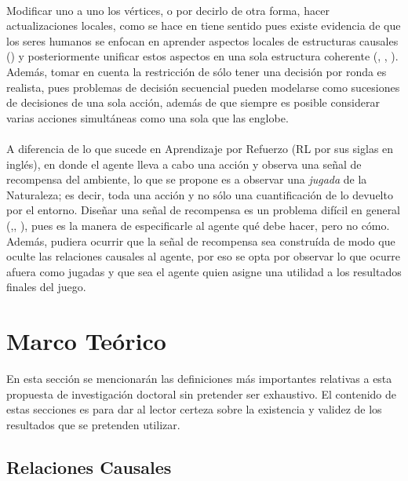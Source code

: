 \documentclass[11pt]{article}
\theoremstyle{plain}
\begin{document}
\\
\indent Modificar uno a uno los vértices, o por decirlo de otra forma, hacer actualizaciones locales, como se hace en \cite{lattimoreNIPS2016} tiene sentido pues existe evidencia de que los seres humanos se enfocan en aprender aspectos locales de estructuras causales (\cite{danks2014unifying}) y posteriormente unificar estos aspectos en una sola estructura coherente (\cite{fernbach2009causal}, \cite{waldmann2008causal}, \cite{wellen2012learning}). Además, tomar en cuenta la restricción de sólo tener una decisión por ronda es realista, pues problemas de decisión secuencial pueden modelarse como sucesiones de decisiones de una sola acción, además de que siempre es posible considerar varias acciones simultáneas como una sola que las englobe.\\
\\
\indent A diferencia de lo que sucede en Aprendizaje por Refuerzo (RL por sus siglas en inglés), en donde el agente lleva a cabo una acción y observa una señal de recompensa del ambiente, lo que se propone es a observar una \textit{jugada} de la Naturaleza; es decir, toda una acción y no sólo una cuantificación de lo devuelto por el entorno. Diseñar una señal de recompensa es un problema difícil en general (\cite{sutton1998reinforcement},\cite{dewey2014reinforcement}, \cite{DRLnotwork}), pues es la manera de especificarle al agente qué debe hacer, pero no cómo. Además, pudiera ocurrir que la señal de recompensa sea construída de modo que oculte las relaciones causales al agente, por eso se opta por observar lo que ocurre afuera como jugadas y que sea el agente quien asigne una utilidad a los resultados finales del juego.
\section{Marco Teórico}
En esta sección se mencionarán las definiciones más importantes relativas a esta propuesta de investigación doctoral sin pretender ser exhaustivo. El contenido de estas secciones es para dar al lector certeza sobre la existencia y validez de los resultados que se pretenden utilizar. 
	\subsection{Relaciones Causales}
\end{document}
